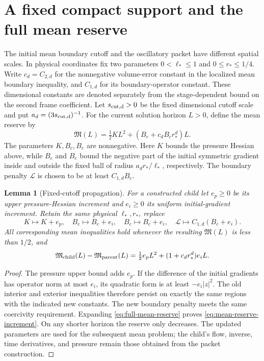 \documentclass[11pt]{article}
\newtheorem{lemma}[theorem]{Lemma}
\theoremstyle{definition}
\begin{document}
\section{A fixed compact support and the full mean reserve}
The initial mean boundary cutoff and the oscillatory packet have
different spatial scales. In
physical coordinates fix two parameters $0<\ell_*\leq1$ and
$0\leq r_*\leq1/4$. Write $c_d=C_{2,d}$ for the nonnegative
volume-error constant in the localized mean boundary inequality, and
$C_{1,d}$ for its boundary-operator constant. These dimensional constants
are denoted separately from the stage-dependent bound on the second
frame coefficient.
Let $s_{\rm cut,d}>0$ be the fixed dimensional cutoff scale and put
$a_d=(3s_{\rm cut,d})^{-1}$. For the current
solution horizon $L>0$, define the mean reserve by
\begin{equation}\label{eq:full-mean-reserve}
 \mathfrak M(L)=\tfrac12 K L^2+(B_e+c_d B_c r_*^d)L.
\end{equation}
The parameters $K,B_c,B_e$ are nonnegative. Here $K$ bounds the pressure
Hessian above, while $B_c$ and $B_e$ bound
the negative part of the initial symmetric gradient inside and outside
the fixed ball of radius $a_d r_*/\ell_*$, respectively. The boundary
penalty $\mathcal L$ is chosen to be at least $C_{1,d}B_c$.

\begin{lemma}[Fixed-cutoff propagation]\label{lem:fixed-cutoff}
For a constructed child let $e_p\geq0$ be its upper pressure-Hessian
increment and $e_i\geq0$ its uniform initial-gradient increment. Retain
the same physical $\ell_*,r_*$, replace
\[
 K\mapsto K+e_p,\quad B_e\mapsto B_e+e_i,\quad
 B_c\mapsto B_c+e_i,\quad \mathcal L\mapsto C_{1,d}(B_c+e_i).
\]
All corresponding mean inequalities hold whenever the resulting
$\mathfrak M(L)$ is less than $1/2$, and
\begin{equation}\label{eq:mean-reserve-increment}
 \mathfrak M_{\rm child}(L)-\mathfrak M_{\rm parent}(L)
   =\tfrac12 e_p L^2+(1+c_d r_*^d)e_iL.
\end{equation}
\end{lemma}
\begin{proof}
The pressure upper bound adds $e_p$. If the difference of the initial
gradients has operator norm at most $e_i$, its quadratic form is at
least $-e_i|z|^2$. The old interior and exterior inequalities therefore
persist on exactly the same regions with the indicated new constants.
The new boundary penalty meets the same coercivity requirement.
Expanding \eqref{eq:full-mean-reserve} proves
\eqref{eq:mean-reserve-increment}. On any shorter horizon the reserve
only decreases. The updated parameters are used for the subsequent mean
problem; the child's flow, inverse, time derivatives, and pressure remain
those obtained from the packet construction.
\end{proof}
\end{document}
